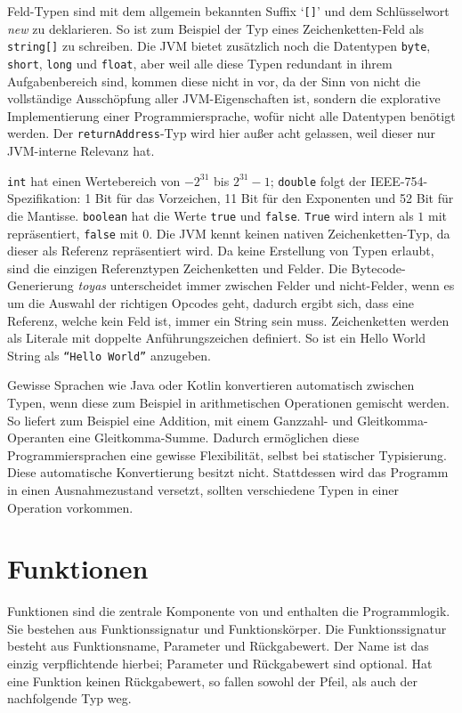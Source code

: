 Feld-Typen sind mit dem allgemein bekannten Suffix `\texttt{[]}' und dem Schlüsselwort \textit{new} zu deklarieren. So ist zum Beispiel der Typ eines Zeichenketten-Feld als \texttt{string[]} zu schreiben. Die JVM bietet zusätzlich noch die Datentypen \texttt{byte}, \texttt{short}, \texttt{long} und \texttt{float}, aber weil alle diese Typen redundant in ihrem Aufgabenbereich sind, kommen diese nicht in \toya vor, da der Sinn von \toya nicht die vollständige Ausschöpfung aller JVM-Eigenschaften ist, sondern die explorative Implementierung einer Programmiersprache, wofür nicht alle Datentypen benötigt werden. Der \texttt{returnAddress}-Typ wird hier außer acht gelassen, weil dieser nur JVM-interne Relevanz hat.

\texttt{int} hat einen Wertebereich von $-2^{31}$ bis $2^{31} - 1$; \texttt{double} folgt der IEEE-754-Spezifikation: 1 Bit für das Vorzeichen, 11 Bit für den Exponenten und 52 Bit für die Mantisse. \texttt{boolean} hat die Werte \texttt{true} und \texttt{false}. \texttt{True} wird intern als $1$ mit repräsentiert, \texttt{false} mit 0. Die JVM kennt keinen nativen Zeichenketten-Typ, da dieser als Referenz repräsentiert wird. Da \toya keine Erstellung von Typen erlaubt, sind die einzigen Referenztypen Zeichenketten und Felder. Die Bytecode-Generierung \textit{toyas} unterscheidet immer zwischen Felder und nicht-Felder, wenn es um die Auswahl der richtigen Opcodes geht, dadurch ergibt sich, dass eine Referenz, welche kein Feld ist, immer ein String sein muss. Zeichenketten werden als Literale mit doppelte Anführungszeichen definiert. So ist ein Hello World String als \texttt{``Hello World''} anzugeben.

Gewisse Sprachen wie Java oder Kotlin konvertieren automatisch zwischen Typen, wenn diese zum Beispiel in arithmetischen Operationen gemischt werden. So liefert zum Beispiel eine Addition, mit einem Ganzzahl- und Gleitkomma-Operanten eine Gleitkomma-Summe. Dadurch ermöglichen diese Programmiersprachen eine gewisse Flexibilität, selbst bei statischer Typisierung. Diese automatische Konvertierung besitzt \toya nicht. Stattdessen wird das Programm in einen Ausnahmezustand versetzt, sollten verschiedene Typen in einer Operation vorkommen.

\section{Funktionen}

Funktionen sind die zentrale Komponente von \toya und enthalten die Programmlogik.
Sie bestehen aus Funktionssignatur und Funktionskörper. Die Funktionssignatur besteht aus Funktionsname, Parameter und Rückgabewert. Der Name ist das einzig verpflichtende hierbei; Parameter und Rückgabewert sind optional. Hat eine Funktion keinen Rückgabewert, so fallen sowohl der Pfeil, als auch der nachfolgende Typ weg.

